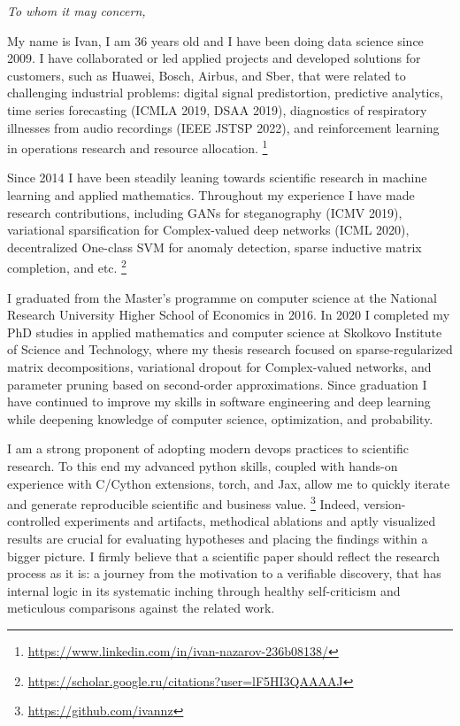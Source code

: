 \documentclass[12pt]{letter}
\begin{document}
\thispagestyle{empty}

\emph{To whom it may concern,}
\par\medskip

My name is Ivan, I am 36 years old and I have been doing data science since 2009. I have collaborated or led applied projects and developed solutions for customers, such as Huawei, Bosch, Airbus, and Sber, that were related to challenging industrial problems: digital signal predistortion, predictive analytics, time series forecasting (ICMLA 2019, DSAA 2019), diagnostics of respiratory illnesses from audio recordings (IEEE JSTSP 2022), and reinforcement learning in operations research and resource allocation.%
\footnote{
    \url{https://www.linkedin.com/in/ivan-nazarov-236b08138/}
}

Since 2014 I have been steadily leaning towards scientific research in machine learning and applied mathematics. Throughout my experience I have made research contributions, including GANs for steganography (ICMV 2019), variational sparsification for Complex-valued deep networks (ICML 2020), decentralized One-class SVM for anomaly detection, sparse inductive matrix completion, and etc.%
\footnote{
    \url{https://scholar.google.ru/citations?user=lF5HI3QAAAAJ}
}

I graduated from the Master's programme on computer science at the National Research University Higher School of Economics in 2016. In 2020 I completed my PhD studies in applied mathematics and computer science at Skolkovo Institute of Science and Technology, where my thesis research focused on sparse-regularized matrix decompositions, variational dropout for Complex-valued networks, and parameter pruning based on second-order approximations. Since graduation I have continued to improve my skills in software engineering and deep learning while deepening knowledge of computer science, optimization, and probability.

I am a strong proponent of adopting modern devops practices to scientific research. To this end my advanced python skills, coupled with hands-on experience with C/Cython extensions, torch, and Jax, allow me to quickly iterate and generate reproducible scientific and business value.%
\footnote{
    \url{https://github.com/ivannz}
}
Indeed, version-controlled experiments and artifacts, methodical ablations and aptly visualized results are crucial for evaluating hypotheses and placing the findings within a bigger picture. I firmly believe that a scientific paper should reflect the research process as it is: a journey from the motivation to a verifiable discovery, that has internal logic in its systematic inching through healthy self-criticism and meticulous comparisons against the related work.
% 
\end{document}
